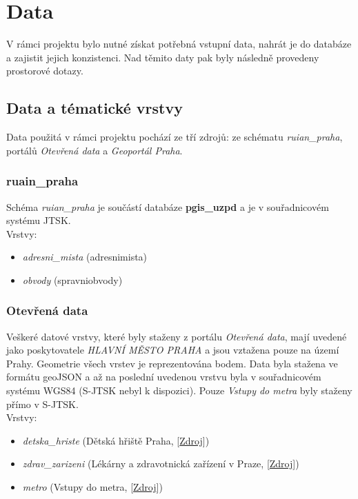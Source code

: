 \documentclass[a4paper, 12pt]{article}
\begin{document}
\section{Data}
V rámci projektu bylo nutné získat potřebná vstupní data, nahrát je do databáze a zajistit jejich konzistenci. Nad těmito daty pak byly následně provedeny prostorové dotazy.

\subsection{Data a tématické vrstvy}
Data použitá v rámci projektu pochází ze tří zdrojů: ze schématu \textit{ruian\_praha}, portálů \textit{Otevřená data} a \textit{Geoportál Praha}.

\subsubsection{ruain\_praha}
Schéma \textit{ruian\_praha} je součástí databáze \textbf{pgis\_uzpd} a je v souřadnicovém systému JTSK.\\

Vrstvy:
\begin{itemize}
\item \textsl{adresni\_mista} (adresnimista)
\item \textsl{obvody} (spravniobvody)
\end{itemize}

\subsubsection{Otevřená data}
Veškeré datové vrstvy, které byly staženy z portálu \textit{Otevřená data}, mají uvedené jako  pos\-ky\-tovatele \textsl{HLAVNÍ MĚSTO PRAHA} a jsou vztažena pouze na území Prahy. Geometrie všech vrstev je reprezentována bodem. Data byla stažena ve formátu geoJSON a až na poslední uvedenou vrstvu byla v souřadnicovém systému WGS84 (S-JTSK nebyl k dispozici). Pouze \textsl{Vstupy do metra} byly staženy přímo v S-JTSK.\\

Vrstvy:  
\begin{itemize}
\item \textsl{detska\_hriste} (Dětská hřiště Praha, [\href{https://data.gov.cz/datov%C3%A1-sada?iri=https%3A%2F%2Fdata.gov.cz%2Fzdroj%2Fdatov%C3%A1-sada%2Fhttp---opendata.praha.eu-api-3-action-package_show-id-detska-hriste-praha}{Zdroj}])
\item \textsl{zdrav\_zarizeni} (Lékárny a zdravotnická zařízení v Praze, [\href{https://data.gov.cz/datov%C3%A1-sada?iri=https%3A%2F%2Fdata.gov.cz%2Fzdroj%2Fdatov%C3%A1-sada%2Fhttp---opendata.praha.eu-api-3-action-package_show-id-lekarny-a-zdravotnicka-zarizeni-v-praze}{Zdroj}])
\item \textsl{metro} (Vstupy do metra, [\href{https://data.gov.cz/datov%C3%A1-sada?iri=https%3A%2F%2Fdata.gov.cz%2Fzdroj%2Fdatov%C3%A1-sada%2Fhttp---opendata.praha.eu-api-3-action-package_show-id-ipr-prazska_integrovana_doprava_-_vstupy_do_metra}{Zdroj}])
\end{itemize}
\end{document}
